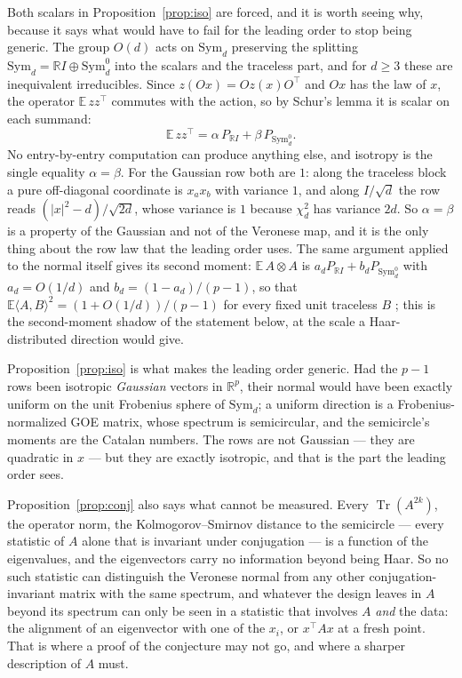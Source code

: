 \documentclass[11pt]{article}
\theoremstyle{definition}
\DeclareMathOperator{\Tr}{Tr}
\newcommand{\R}{\mathbb{R}}
\newcommand{\E}{\mathbb{E}}
\begin{document}
Both scalars in Proposition~\ref{prop:iso} are forced, and it is worth seeing why, because it says
what would have to fail for the leading order to stop being generic. The group $O(d)$ acts on
$\mathrm{Sym}_d$ preserving the splitting $\mathrm{Sym}_d=\R I\oplus\mathrm{Sym}_d^0$ into the scalars
and the traceless part, and for $d\ge3$ these are inequivalent irreducibles. Since
$z(Ox)=Oz(x)O^\top$ and $Ox$ has the law of $x$, the operator $\E\,zz^\top$ commutes with the action,
so by Schur's lemma it is scalar on each summand:
\[
\E\,zz^\top=\alpha\,P_{\R I}+\beta\,P_{\mathrm{Sym}_d^0} .
\]
No entry-by-entry computation can produce anything else, and isotropy is the single equality
$\alpha=\beta$. For the Gaussian row both are $1$: along the traceless block a pure off-diagonal
coordinate is $x_ax_b$ with variance $1$, and along $I/\sqrt d$ the row reads
$(\lvert x\rvert^2-d)/\sqrt{2d}$, whose variance is $1$ because $\chi^2_d$ has variance $2d$. So
$\alpha=\beta$ is a property of the Gaussian and not of the Veronese map, and it is the only thing
about the row law that the leading order uses. The same argument applied to the normal itself gives
its second moment: $\E\,A\otimes A$ is $a_dP_{\R I}+b_dP_{\mathrm{Sym}_d^0}$ with $a_d=O(1/d)$ and
$b_d=(1-a_d)/(p-1)$, so that $\E\langle A,B\rangle^2=(1+O(1/d))/(p-1)$ for every fixed unit
traceless $B$ \cite{PN24}; this is the second-moment shadow of the statement below, at the scale a
Haar-distributed direction would give.

Proposition~\ref{prop:iso} is what makes the leading order generic. Had the $p-1$ rows been
isotropic \emph{Gaussian} vectors in $\R^p$, their normal would have been exactly uniform on the unit
Frobenius sphere of $\mathrm{Sym}_d$; a uniform direction is a Frobenius-normalized GOE matrix, whose
spectrum is semicircular, and the semicircle's moments are the Catalan numbers. The rows are not
Gaussian --- they are quadratic in $x$ --- but they are exactly isotropic, and that is the part the
leading order sees.

Proposition~\ref{prop:conj} also says what cannot be measured. Every $\Tr(A^{2k})$, the operator
norm, the Kolmogorov--Smirnov distance to the semicircle --- every statistic of $A$ alone that is
invariant under conjugation --- is a function of the eigenvalues, and the eigenvectors carry no
information beyond being Haar. So no such statistic can distinguish the Veronese normal from any
other conjugation-invariant matrix with the same spectrum, and whatever the design leaves in $A$
beyond its spectrum can only be seen in a statistic that involves $A$ \emph{and} the data: the
alignment of an eigenvector with one of the $x_i$, or $x^\top Ax$ at a fresh point. That is where a
proof of the conjecture may not go, and where a sharper description of $A$ must.
\end{document}
